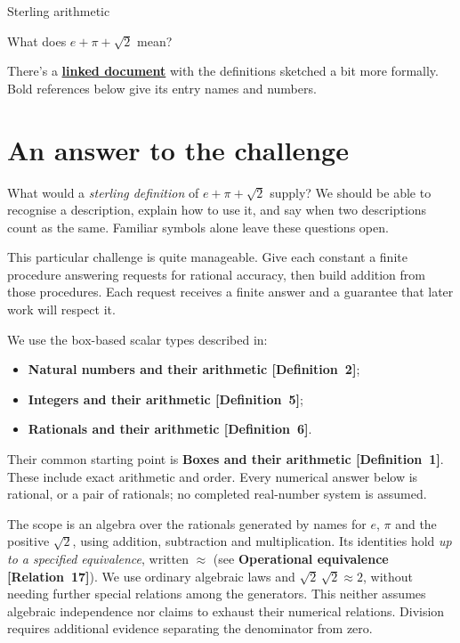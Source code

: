 \documentclass[11pt]{article}
\newcommand{\entryname}[3]{\textbf{#3 \mbox{[#1~#2]}}}
\begin{document}
\begin{center}
  {\LARGE Sterling arithmetic\par}
  \vspace{6pt}
  {\large What does $e+\pi+\sqrt2$ mean?\par}
\end{center}
\vspace{6pt}

There's a \href{Definitions.pdf}{\textbf{linked document}} with the definitions
sketched a bit more formally. Bold references below give its entry names and
numbers.

\vspace{6pt}
\section{An answer to the challenge}

What would a \emph{sterling definition} of $e+\pi+\sqrt2$ supply? We should
be able to recognise a description, explain how to use it, and say when two
descriptions count as the same. Familiar symbols alone leave these questions
open.

This particular challenge is quite manageable. Give each constant a finite
procedure answering requests for rational accuracy, then build addition
from those procedures. Each request receives a finite answer and a guarantee
that later work will respect it.

We use the box-based scalar types described in:
\begin{itemize}
\item \entryname{Definition}{2}{Natural numbers and their arithmetic};
\item \entryname{Definition}{5}{Integers and their arithmetic};
\item \entryname{Definition}{6}{Rationals and their arithmetic}.
\end{itemize}
Their common starting point is
\entryname{Definition}{1}{Boxes and their arithmetic}. These include exact
arithmetic and order. Every numerical answer below is
rational, or a pair of rationals; no completed real-number system is assumed.

The scope is an algebra over the rationals generated by names for $e$,
$\pi$ and the positive $\sqrt2$, using addition, subtraction and
multiplication. Its identities hold \emph{up to a specified equivalence},
written $\approx$ (see \entryname{Relation}{17}{Operational equivalence}).
We use ordinary algebraic laws and
$\sqrt2\,\sqrt2\approx2$, without needing further special relations among
the generators. This neither assumes algebraic independence nor claims to
exhaust their numerical relations. Division requires additional evidence
separating the denominator from zero.
\end{document}
